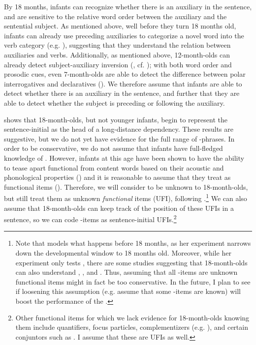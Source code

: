  By 18 months, infants can recognize whether there is an auxiliary in the sentence, and are sensitive to the relative word order between the auxiliary and the sentential subject. As mentioned above, well before they turn 18 months old, infants can already use preceding auxiliaries to categorize a novel word into the verb category (e.g. \cite{peterson2006aux, mintz2006verb}), suggesting that they understand the relation between auxiliaries and verbs. Additionally, as mentioned above, 12-month-olds can already detect subject-auxiliary inversion (\cite{geffenmintz2015wordorder}, cf. \cite{erreich1984,ambridge2006auxinvert}); with both word order and prosodic cues, even 7-month-olds are able to detect the difference between polar interrogatives and declaratives (\cite{geffenmintz2011}). We therefore assume that infants are able to detect whether there is an auxiliary in the sentence, and further that they are able to detect whether the subject is preceding or following the auxiliary.

 \textcite{perkinslidz2021wh} shows that 18-month-olds, but not younger infants, begin to represent the sentence-initial  as the head of a long-distance dependency. These results are suggestive, but we do not yet have evidence for the full range of \twh-phrases. In order to be conservative, we do not assume that infants have full-fledged knowledge of \twh{}. However, infants at this age have been shown to have the ability to tease apart functional from content words based on their acoustic and phonological properties (\cite{shi1999func,shi2014functional}) and it is reasonable to assume that they treat  as functional items (\cite{perkins2019}). Therefore, we will consider \twh{} to be unknown to 18-month-olds, but still treat them as unknown \emph{functional} items (UFI), following \textcite{perkins2019}.\footnote{Note that \textcite{perkins2019} models what happens before 18 months, as her experiment narrows down the developmental window to 18 months old. Moreover, while her experiment only tests , there are some studies suggesting that 18-month-olds can also understand , , and . Thus, assuming that all \twh-items are unknown functional items might in fact be too conservative. In the future, I plan to see if loosening this assumption (e.g. assume that some \twh-items are known) will boost the performance of the \dlearnerabbr{}.} We can also assume that 18-month-olds can keep track of the position of these UFIs in a sentence, so we can code \twh-items as sentence-initial UFIs.\footnote{Other functional items for which we lack evidence for 18-month-olds knowing them include quantifiers, focus particles, complementizers (e.g. ), and certain conjuntors such as . I assume that these are UFIs as well.} 

